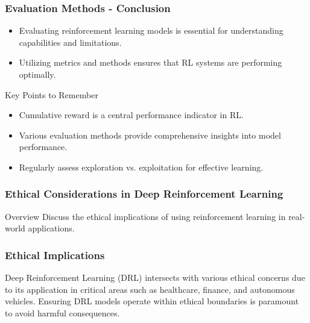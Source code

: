 \documentclass[aspectratio=169]{beamer}
\begin{document}
\begin{frame}[fragile]
    \frametitle{Evaluation Methods - Conclusion}
    \begin{itemize}
        \item Evaluating reinforcement learning models is essential for understanding capabilities and limitations.
        \item Utilizing metrics and methods ensures that RL systems are performing optimally.
    \end{itemize}
    
    \begin{block}{Key Points to Remember}
        \begin{itemize}
            \item Cumulative reward is a central performance indicator in RL.
            \item Various evaluation methods provide comprehensive insights into model performance.
            \item Regularly assess exploration vs. exploitation for effective learning.
        \end{itemize}
    \end{block}
\end{frame}

\begin{frame}[fragile]
    \frametitle{Ethical Considerations in Deep Reinforcement Learning}
    \begin{block}{Overview}
        Discuss the ethical implications of using reinforcement learning in real-world applications.
    \end{block}
\end{frame}

\begin{frame}[fragile]
    \frametitle{Ethical Implications}
    Deep Reinforcement Learning (DRL) intersects with various ethical concerns due to its application in critical areas such as healthcare, finance, and autonomous vehicles. Ensuring DRL models operate within ethical boundaries is paramount to avoid harmful consequences.
\end{frame}
\end{document}
